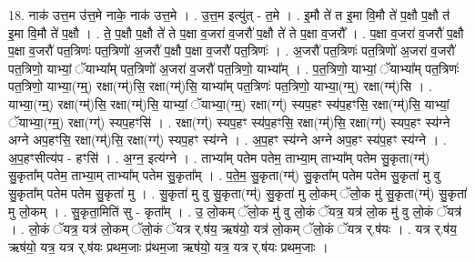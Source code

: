 \documentclass[17pt]{extarticle}
\begin{document}
18. नाक॑ उत्त॒म उ॑त्त॒मे नाके॒ नाक॑ उत्त॒मे । . उ॒त्त॒म इत्यु॑त् - त॒मे । . इ॒मौ ते॑ त इ॒मा वि॒मौ ते॑ प॒क्षौ प॒क्षौ त॑ इ॒मा वि॒मौ ते॑ प॒क्षौ । . ते॒ प॒क्षौ प॒क्षौ ते॑ ते प॒क्षा व॒जरा॑ व॒जरौ॑ प॒क्षौ ते॑ ते प॒क्षा व॒जरौ᳚ । . प॒क्षा व॒जरा॑ व॒जरौ॑ प॒क्षौ प॒क्षा व॒जरौ॑ पत॒त्रिणः॑ पत॒त्रिणो॑ अ॒जरौ॑ प॒क्षौ प॒क्षा व॒जरौ॑ पत॒त्रिणः॑ । . अ॒जरौ॑ पत॒त्रिणः॑ पत॒त्रिणो॑ अ॒जरा॑ व॒जरौ॑ पत॒त्रिणो॒ याभ्यां॒ ॅयाभ्या᳚म् पत॒त्रिणो॑ अ॒जरा॑ व॒जरौ॑ पत॒त्रिणो॒ याभ्या᳚म् । . प॒त॒त्रिणो॒ याभ्यां॒ ॅयाभ्या᳚म् पत॒त्रिणः॑ पत॒त्रिणो॒ याभ्या॒(ग्म्॒) रक्षा(ग्म्॑)सि॒ रक्षा(ग्म्॑)सि॒ याभ्या᳚म् पत॒त्रिणः॑ पत॒त्रिणो॒ याभ्या॒(ग्म्॒) रक्षा(ग्म्॑)सि । . याभ्या॒(ग्म्॒) रक्षा(ग्म्॑)सि॒ रक्षा(ग्म्॑)सि॒ याभ्यां॒ ॅयाभ्या॒(ग्म्॒) रक्षा(ग्ग्॑) स्यप॒हꣳ स्य॑प॒हꣳसि॒ रक्षा(ग्म्॑)सि॒ याभ्यां॒ ॅयाभ्या॒(ग्म्॒) रक्षा(ग्ग्॑) स्यप॒हꣳसि॑ । . रक्षा(ग्ग्॑) स्यप॒हꣳ स्य॑प॒हꣳसि॒ रक्षा(ग्म्॑)सि॒ रक्षा(ग्ग्॑) स्यप॒हꣳ स्य॑ग्ने अग्ने अप॒हꣳसि॒ रक्षा(ग्म्॑)सि॒ रक्षा(ग्ग्॑) स्यप॒हꣳ स्य॑ग्ने । . अ॒प॒हꣳ स्य॑ग्ने अग्ने अप॒हꣳ स्य॑प॒हꣳ स्य॑ग्ने । . अ॒प॒हꣳसीत्य॑प - हꣳसि॑ । . अ॒ग्न॒ इत्य॑ग्ने । . ताभ्या᳚म् पतेम पतेम॒ ताभ्या॒म् ताभ्या᳚म् पतेम सु॒कृता(ग्म्॑) सु॒कृता᳚म् पतेम॒ ताभ्या॒म् ताभ्या᳚म् पतेम सु॒कृता᳚म् । . प॒ते॒म॒ सु॒कृता(ग्म्॑) सु॒कृता᳚म् पतेम पतेम सु॒कृता॑ मु वु सु॒कृता᳚म् पतेम पतेम सु॒कृता॑ मु । . सु॒कृता॑ मु वु सु॒कृता(ग्म्॑) सु॒कृता॑ मु लो॒कम् ॅलो॒क मु॑ सु॒कृता(ग्म्॑) सु॒कृता॑ मु लो॒कम् । . सु॒कृता॒मिति॑ सु - कृता᳚म् । . उ॒ लो॒कम् ॅलो॒क मु॑ वु लो॒कं ॅयत्र॒ यत्र॑ लो॒क मु॑ वु लो॒कं ॅयत्र॑ । . लो॒कं ॅयत्र॒ यत्र॑ लो॒कम् ॅलो॒कं ॅयत्र र्.ष॑य॒ ऋष॑यो॒ यत्र॑ लो॒कम् ॅलो॒कं ॅयत्र र्.ष॑यः । . यत्र र्.ष॑य॒ ऋष॑यो॒ यत्र॒ यत्र र्.ष॑यः प्रथम॒जाः प्र॑थम॒जा ऋष॑यो॒ यत्र॒ यत्र र्.ष॑यः प्रथम॒जाः । \newline
\end{document}
